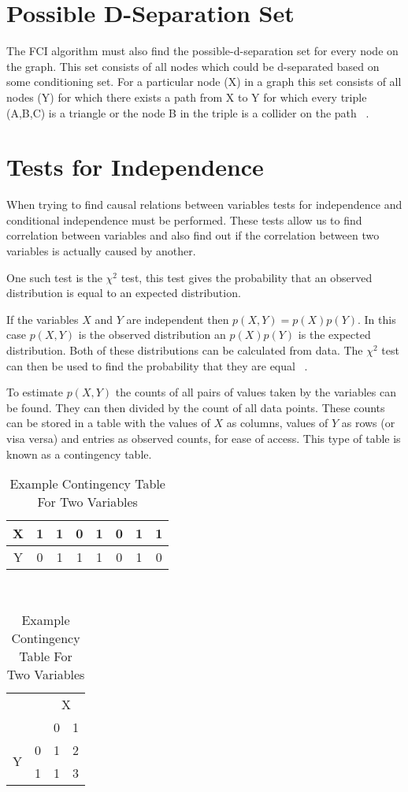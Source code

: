 \documentclass{UoYCSproject}
\begin{document}
\section{Possible D-Separation Set}
The FCI algorithm must also find the possible-d-separation set for every node on the graph. This set consists of all nodes which could be d-separated based on some conditioning set. For a particular node (X) in a graph this set consists of all nodes (Y) for which there exists a path from X to Y for which every triple (A,B,C) is a triangle or the node B in the triple is a collider on the path  ~\parencite{colombo2012learning2}.


\section{Tests for Independence}
When trying to find causal relations between variables tests for independence and conditional independence must be performed. These tests allow us to find correlation between variables and also find out if the correlation between two variables is actually caused by another.

One such test is the $\chi^2$ test, this test gives the probability that an observed distribution is equal to an expected distribution.

If the variables $X$ and $Y$ are independent then $p(X,Y) = p(X)p(Y)$. In this case $p(X,Y)$ is the observed distribution an $p(X)p(Y)$ is the expected distribution. Both of these distributions can be calculated from data. The $\chi^2$ test can then be used to find the probability that they are equal ~\parencite{Pearson}.

To estimate $p(X,Y)$ the counts of all pairs of values taken by the variables can be found. They can then divided by the count of all data points. These counts can be stored in a table with the values of $X$ as columns, values of $Y$ as rows (or visa versa) and entries as observed counts, for ease of access. This type of table is known as a contingency table.

\begin{table}[h!]
	\centering
	\begin{tabular}{c|c c c c c c c}
		X & 1 & 1 & 0 & 1 & 0 & 1 & 1\\ \hline
		Y & 0 & 1 & 1 & 1 & 0 & 1 & 0\\
	\end{tabular}
\\
	\begin{tabular}{c|c|cc|}
		\multicolumn{2}{c}{}& \multicolumn{2}{c}{X} \\ \cline{3-4}
		\multicolumn{2}{c|}{} & 0 & 1 \\ \cline{2-4}
		\multirow{2}{*}{Y} & 0 & 1 & 2\\
		& 1 & 1 & 3 \\
		\cline{2-4} 
	\end{tabular}
\caption{Example Contingency Table For Two Variables}
\end{table}
\end{document}
